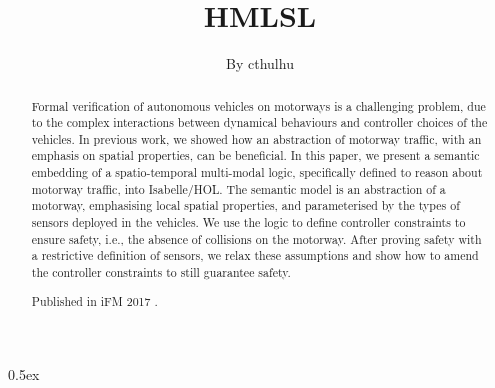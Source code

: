 \documentclass[11pt,a4paper]{article}
\begin{document}
\title{HMLSL}
\author{By cthulhu}
\maketitle

\begin{abstract}
Formal verification of autonomous vehicles on motorways is a challenging problem, 
due to the complex interactions between
dynamical behaviours and controller choices of the vehicles. In previous 
work, we showed how an abstraction of motorway traffic, with an
emphasis on spatial properties, can be beneficial. In this paper,
we present a semantic embedding of a spatio-temporal multi-modal
logic, specifically defined to reason about motorway traffic, into Isabelle/HOL. 
The semantic model is an abstraction of a motorway, 
emphasising local spatial properties, and parameterised by the types of sensors
deployed in the vehicles. We use the logic
to define controller constraints to ensure safety, i.e., the
absence of collisions on the motorway. 
After proving safety with a restrictive definition of
sensors, we relax these assumptions and show how to amend
the controller constraints to still guarantee safety.

Published in iFM 2017 \cite{Linker2017}.
\end{abstract}

\tableofcontents

\parindent 0pt\parskip 0.5ex





\end{document}
